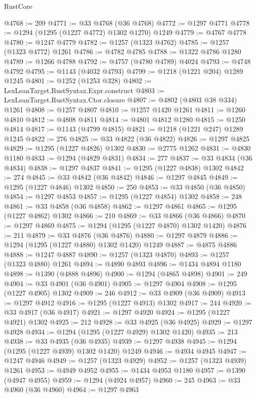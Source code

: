 \begin{lexlean}{RustCore}
\begin{coremodule}
@4768 := 209
@4771 := @33 @4768 (@36 @4768)
@4772 := @1297 @4771
@4778 := @1294 (@1295 (@1227 @4772) @1302 @1270) @1249
@4779 := @4767 @4778
@4780 := @1247 @4779
@4782 := @1257 (@1323 @4762)
@4785 := @1257 (@1323 @4772) @1261
@4786 := @4782 @4785
@4788 := @1322 @4786 @1280
@4789 := @1266 @4788
@4792 := @4757 (@4780 @4789) @4024
@4793 := @4748 @4792
@4795 := @1143 (@4032 @4793)
@4799 := @1218 (@1221 @204) @1289 @1245
@4801 := @1252 (@1253 @328)
@4802 := LexLeanTarget.RustSyntax.Expr.construct
@4803 := LexLeanTarget.RustSyntax.Ctor.closure
@4807 := @4802 (@4803 @38 @334) @1261
@4808 := @1257 @4807
@4810 := @1257 @1420 @1261
@4811 := @1260 @4810
@4812 := @4808 @4811
@4814 := @4801 @4812 @1280
@4815 := @1250 @4814
@4817 := @1143 (@4799 @4815)
@4821 := @1218 (@1221 @247) @1289 @1245
@4822 := 276
@4825 := @33 @4822 (@36 @4822)
@4826 := @1297 @4825
@4829 := @1295 (@1227 @4826) @1302
@4830 := @2775 @1262
@4831 := @4830 @1180
@4833 := @1294 (@4829 @4831)
@4834 := 277
@4837 := @33 @4834 (@36 @4834)
@4838 := @1297 @4837
@4841 := @1295 (@1227 @4838) @1302
@4842 := 274
@4845 := @33 @4842 (@36 @4842)
@4846 := @1297 @4845
@4849 := @1295 (@1227 @4846) @1302
@4850 := 250
@4853 := @33 @4850 (@36 @4850)
@4854 := @1297 @4853
@4857 := @1295 (@1227 @4854) @1302
@4858 := 248
@4861 := @33 @4858 (@36 @4858)
@4862 := @1297 @4861
@4865 := @1295 (@1227 @4862) @1302
@4866 := 210
@4869 := @33 @4866 (@36 @4866)
@4870 := @1297 @4869
@4875 := @1294 (@1295 (@1227 @4870) @1302 @1420)
@4876 := 211
@4879 := @33 @4876 (@36 @4876)
@4880 := @1297 @4879
@4886 := @1294 (@1295 (@1227 @4880) @1302 @1420) @1249
@4887 := @4875 @4886
@4888 := @1247 @4887
@4890 := @1257 (@1323 @4870)
@4893 := @1257 (@1323 @4880) @1261
@4894 := @4890 @4893
@4896 := @1434 @4894 @1180
@4898 := @1390 (@4888 @4896)
@4900 := @1294 (@4865 @4898)
@4901 := 249
@4904 := @33 @4901 (@36 @4901)
@4905 := @1297 @4904
@4908 := @1295 (@1227 @4905) @1302
@4909 := 246
@4912 := @33 @4909 (@36 @4909)
@4913 := @1297 @4912
@4916 := @1295 (@1227 @4913) @1302
@4917 := 244
@4920 := @33 @4917 (@36 @4917)
@4921 := @1297 @4920
@4924 := @1295 (@1227 @4921) @1302
@4925 := 212
@4928 := @33 @4925 (@36 @4925)
@4929 := @1297 @4928
@4934 := @1294 (@1295 (@1227 @4929) @1302 @1420)
@4935 := 213
@4938 := @33 @4935 (@36 @4935)
@4939 := @1297 @4938
@4945 := @1294 (@1295 (@1227 @4939) @1302 @1420) @1249
@4946 := @4934 @4945
@4947 := @1247 @4946
@4949 := @1257 (@1323 @4929)
@4952 := @1257 (@1323 @4939) @1261
@4953 := @4949 @4952
@4955 := @1434 @4953 @1180
@4957 := @1390 (@4947 @4955)
@4959 := @1294 (@4924 @4957)
@4960 := 245
@4963 := @33 @4960 (@36 @4960)
@4964 := @1297 @4963

\end{coremodule}
\end{lexlean}

